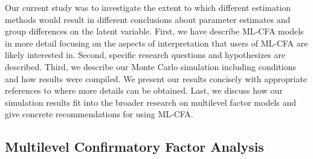 \documentclass[Review,sageh,times, doublespace]{sagej}
\begin{document}
Our current study was to investigate the extent to which different estimation methods would result in different conclusions about parameter estimates and group differences on the latent variable.
First, we have describe ML-CFA models in more detail focusing on the aspects of interpretation that users of ML-CFA are likely interested in.
Second, specific research questions and hypothesizes are described.
Third, we describe our Monte Carlo simulation including conditions and how results were compiled.
We present our results concisely with appropriate references to where more details can be obtained.
Last, we discuss how our simulation results fit into the broader research on multilevel factor models and give concrete recommendations for using ML-CFA.

\subsection{Multilevel Confirmatory Factor Analysis}
\end{document}
